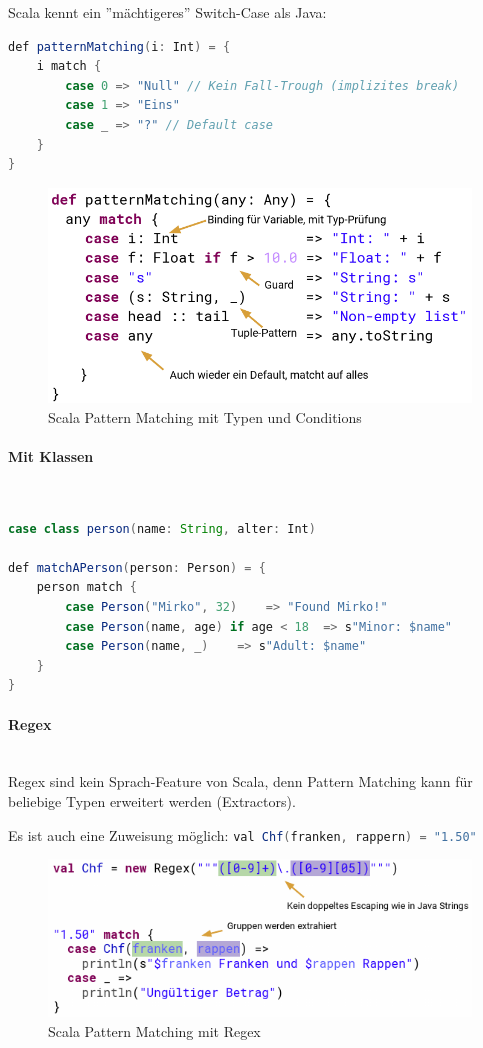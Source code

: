 Scala kennt ein ''mächtigeres'' Switch-Case als Java:

\begin{lstlisting}[language=java]
def patternMatching(i: Int) = {
	i match {
		case 0 => "Null" // Kein Fall-Trough (implizites break)
		case 1 => "Eins"
		case _ => "?" // Default case
	}
}
\end{lstlisting}

\begin{figure}[h!]
\centering
\includegraphics[width=0.7\linewidth]{images/scala_patternmatching_type_and_conditions}
\caption{Scala Pattern Matching mit Typen und Conditions}
\label{fig:scalapatternmatchingtypeandconditions}
\end{figure}

\paragraph{Mit Klassen} \hfill \\

\begin{lstlisting}[language=java]
case class person(name: String, alter: Int)

def matchAPerson(person: Person) = {
	person match {
		case Person("Mirko", 32)	=> "Found Mirko!"
		case Person(name, age) if age < 18	=> s"Minor: $name"
		case Person(name, _)	=> s"Adult: $name"
	}
}
\end{lstlisting}

\paragraph{Regex} \hfill \\

Regex sind kein Sprach-Feature von Scala, denn Pattern Matching kann für beliebige Typen erweitert werden (Extractors).

Es ist auch eine Zuweisung möglich: \lstinline[language=java]|val Chf(franken, rappern) = "1.50"|

\begin{figure}
\centering
\includegraphics[width=0.7\linewidth]{images/scala_patternmatching_regex}
\caption{Scala Pattern Matching mit Regex}
\label{fig:scalapatternmatchingregex}
\end{figure}


